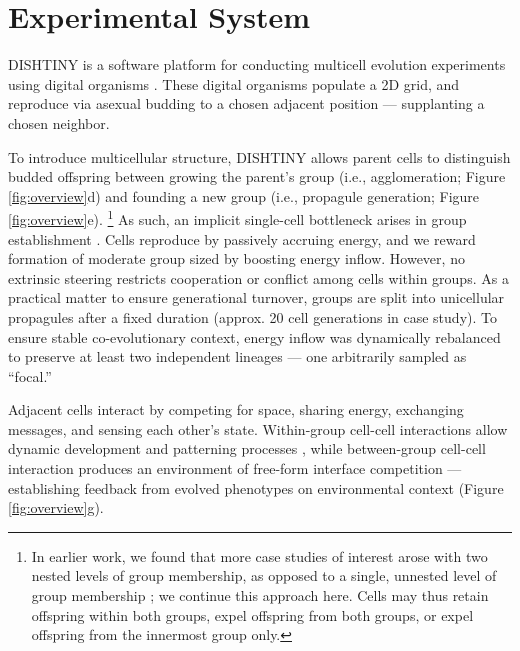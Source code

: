 \section{Experimental System}
\label{sec:system}



DISHTINY is a software platform for conducting multicell evolution experiments using digital organisms \citep{moreno2019toward}.
These digital organisms populate a 2D grid, and reproduce via asexual budding to a chosen adjacent position --- supplanting a chosen neighbor.

To introduce multicellular structure, DISHTINY allows parent cells to distinguish budded offspring between growing the parent's group (i.e., agglomeration; Figure \ref{fig:overview}d) and founding a new group (i.e., propagule generation; Figure \ref{fig:overview}e).
\unskip\footnote{%
In earlier work, we found that more case studies of interest arose with two nested levels of group membership, as opposed to a single, unnested level of group membership \citep{moreno2021exploring}; we continue this approach here.
Cells may thus retain offspring within both groups, expel offspring from both groups, or expel offspring from the innermost group only.
}
As such, an implicit single-cell bottleneck arises in group establishment \citep{ratcliff2015origins}.
Cells reproduce by passively accruing energy, and we reward formation of moderate group sized by boosting energy inflow.
However, no extrinsic steering restricts cooperation or conflict among cells within groups.
As a practical matter to ensure generational turnover, groups are split into unicellular propagules after a fixed duration (approx. 20 cell generations in case study).
To ensure stable co-evolutionary context, energy inflow was dynamically rebalanced to preserve at least two independent lineages --- one arbitrarily sampled as ``focal.''

Adjacent cells interact by competing for space, sharing energy, exchanging messages, and sensing each other's state.
Within-group cell-cell interactions allow dynamic development and patterning processes \citep{goldsby2012task,moreno2021exploring}, while between-group cell-cell interaction produces an environment of free-form interface competition --- establishing feedback from evolved phenotypes on environmental context (Figure \ref{fig:overview}g).

